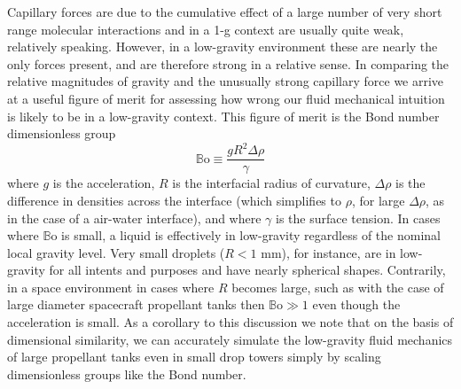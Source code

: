\documentclass[12pt,a4paper,oneside]{book}
\begin{document}
Capillary forces are due to the cumulative effect of a large number of very short range molecular interactions and in a 1-g context are usually quite weak, relatively speaking. However, in a low-gravity environment these are nearly the only forces present, and are therefore strong in a relative sense. In comparing the relative magnitudes of gravity and the unusually strong capillary force we arrive at a useful figure of merit for assessing how wrong our fluid mechanical intuition is likely to be in a low-gravity context. This figure of merit is the Bond number dimensionless group
\[ \mathbb{B}\mbox{o} \equiv \frac{g R^2 \Delta \rho}{\gamma} 
\]
where $g$ is the acceleration, $R$ is the interfacial radius of curvature, $\Delta \rho$ is the difference in densities across the interface (which simplifies to $\rho$, for large $\Delta \rho$, as in the case of a air-water interface), and where $\gamma$ is the surface tension. In cases where $\mathbb{B}\mbox{o}$ is small, a liquid is effectively in low-gravity regardless of the nominal local gravity level. Very small droplets ($R < 1$ mm), for instance, are in low-gravity for all intents and purposes and have nearly spherical shapes. Contrarily, in a space environment in cases where $R$ becomes large, such as with the case of large diameter spacecraft propellant tanks then $ \mathbb{B}\mbox{o} \gg 1$ even though the acceleration is small. As a corollary to this discussion we note that on the basis of dimensional similarity, we can accurately simulate the low-gravity fluid mechanics of large propellant tanks even in small drop towers simply by scaling dimensionless groups like the Bond number. 
\end{document}
